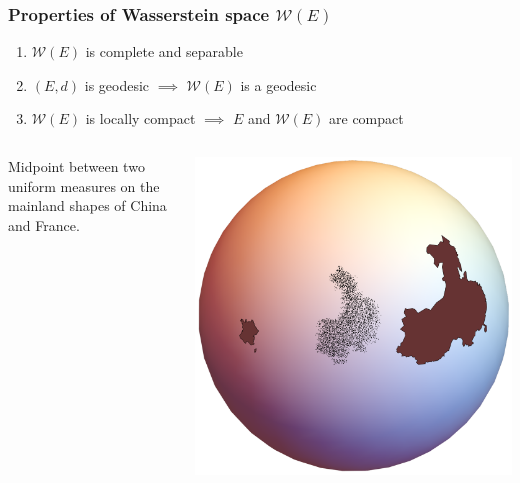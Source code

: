 \documentclass[aspectratio=169]{beamer}
\begin{document}
\begin{frame}
	\frametitle{Properties of Wasserstein space $\mathcal{W}(E)$}
	\begin{enumerate}
		\item<1> $\mathcal{W}(E)$ is complete and separable\\[0.2cm]
		\item $(E,d)$ is geodesic $\implies$ $\mathcal{W}(E)$ is a geodesic\\[0.2cm]
		      \item<1> $\mathcal{W}(E)$ is locally compact $\implies$ $E$ and $\mathcal{W}(E)$ are compact
	\end{enumerate}
	\pause
	\begin{columns}
		\begin{example}
			Midpoint between two uniform measures on
			the mainland shapes of China and France.
		\end{example}
		\begin{center}
			\includegraphics[width=0.5\linewidth]{Chapters/OPT_sphere.pdf}
		\end{center}
	\end{columns}
\end{frame}
\end{document}
